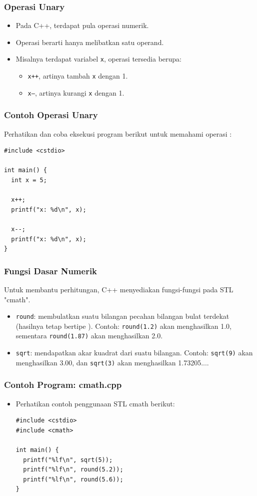 \begin{frame}
\frametitle{Operasi Unary}
\begin{itemize}
  \item Pada C++, terdapat pula operasi  numerik.
  \item Operasi  berarti hanya melibatkan satu operand.
  \item Misalnya terdapat variabel \texttt{x}, operasi  tersedia berupa:
  \begin{itemize}
    \item \texttt{x++}, artinya tambah \texttt{x} dengan 1.
    \item \texttt{x--}, artinya kurangi \texttt{x} dengan 1.
  \end{itemize}
\end{itemize}
\end{frame}

\begin{frame}[fragile]
\frametitle{Contoh Operasi Unary}
Perhatikan dan coba eksekusi program berikut untuk memahami operasi :
\begin{lstlisting}
#include <cstdio>

int main() {
  int x = 5;

  x++;
  printf("x: %d\n", x);

  x--;
  printf("x: %d\n", x);
}
\end{lstlisting}
\end{frame}

\begin{frame}
\frametitle{Fungsi Dasar Numerik}
Untuk membantu perhitungan, C++ menyediakan fungsi-fungsi pada STL "cmath".
\begin{itemize}
  \item \texttt{round}: membulatkan suatu bilangan pecahan bilangan bulat terdekat (hasilnya tetap bertipe ). Contoh: \texttt{round(1.2)} akan menghasilkan 1.0, sementara \texttt{round(1.87)} akan menghasilkan 2.0.
  \item \texttt{sqrt}: mendapatkan akar kuadrat dari suatu bilangan. Contoh: \texttt{sqrt(9)} akan menghasilkan 3.00, dan \texttt{sqrt(3)} akan menghasilkan 1.73205....
\end{itemize}
\end{frame}

\begin{frame}[fragile]
\frametitle{Contoh Program: cmath.cpp}
\begin{itemize}
  \item Perhatikan contoh penggunaan STL cmath berikut:
\begin{lstlisting}
#include <cstdio>
#include <cmath>

int main() {
  printf("%lf\n", sqrt(5));
  printf("%lf\n", round(5.2));
  printf("%lf\n", round(5.6));
}
\end{lstlisting}
\end{itemize}
\end{frame}

